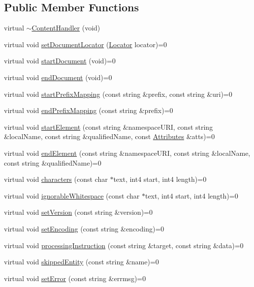 \subsection*{Public Member Functions}
\begin{DoxyCompactItemize}
\item 
virtual \mbox{\hyperlink{class_content_handler_aa338e67b4d0fb4da36de5d9a2eb290c0}{$\sim$\+Content\+Handler}} (void)
\item 
virtual void \mbox{\hyperlink{class_content_handler_aceaa6046b41a125ee4718fdbb009b859}{set\+Document\+Locator}} (\mbox{\hyperlink{xml_8hh_ad34bc338f5e298a1993320898263b741}{Locator}} locator)=0
\item 
virtual void \mbox{\hyperlink{class_content_handler_a7f68f6c0e6f33654c3be999a8da17138}{start\+Document}} (void)=0
\item 
virtual void \mbox{\hyperlink{class_content_handler_a21fb351a3987017008caafcc2c60834b}{end\+Document}} (void)=0
\item 
virtual void \mbox{\hyperlink{class_content_handler_ac6e945ce50f644015db0d3045465c2ca}{start\+Prefix\+Mapping}} (const string \&prefix, const string \&uri)=0
\item 
virtual void \mbox{\hyperlink{class_content_handler_a8eb3c33c544eca57340d7dd61396f399}{end\+Prefix\+Mapping}} (const string \&prefix)=0
\item 
virtual void \mbox{\hyperlink{class_content_handler_a77a58836917fd32b56230151f6d6966e}{start\+Element}} (const string \&namespace\+U\+RI, const string \&local\+Name, const string \&qualified\+Name, const \mbox{\hyperlink{class_attributes}{Attributes}} \&atts)=0
\item 
virtual void \mbox{\hyperlink{class_content_handler_a83a93a2fec8354b96e7ea462e65545af}{end\+Element}} (const string \&namespace\+U\+RI, const string \&local\+Name, const string \&qualified\+Name)=0
\item 
virtual void \mbox{\hyperlink{class_content_handler_a546761acfc0e8cc5fe72bbceaccf9f9e}{characters}} (const char $\ast$text, int4 start, int4 length)=0
\item 
virtual void \mbox{\hyperlink{class_content_handler_a3158c975bb26ff02b941954cb4764da9}{ignorable\+Whitespace}} (const char $\ast$text, int4 start, int4 length)=0
\item 
virtual void \mbox{\hyperlink{class_content_handler_a4b01bbac0e89948eb931c30f826db443}{set\+Version}} (const string \&version)=0
\item 
virtual void \mbox{\hyperlink{class_content_handler_ae8ed0998c2723da7740738811573542e}{set\+Encoding}} (const string \&encoding)=0
\item 
virtual void \mbox{\hyperlink{class_content_handler_a6b3929cb92630d4535b63f6470ff3020}{processing\+Instruction}} (const string \&target, const string \&data)=0
\item 
virtual void \mbox{\hyperlink{class_content_handler_a5d5a40349d86c051c980c1e81cf7ab4c}{skipped\+Entity}} (const string \&name)=0
\item 
virtual void \mbox{\hyperlink{class_content_handler_aec6be0bfc55eda76da189b718a92d3a9}{set\+Error}} (const string \&errmsg)=0
\end{DoxyCompactItemize}


